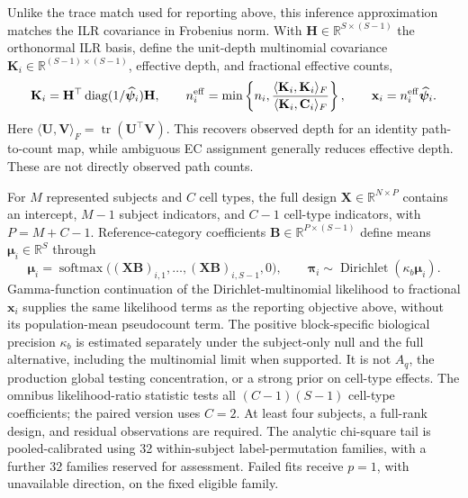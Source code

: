 \documentclass[11pt]{article}
\begin{document}
Unlike the trace match used for reporting above, this inference approximation matches the ILR covariance in Frobenius norm. With \(\mathbf H\in\mathbb R^{S\times(S-1)}\) the orthonormal ILR basis, define the unit-depth multinomial covariance \(\mathbf K_i\in\mathbb R^{(S-1)\times(S-1)}\), effective depth, and fractional effective counts, \begin{equation}\mathbf K_i=\mathbf H^\top\operatorname{diag}(1/\widehat{\boldsymbol\psi}_i)\mathbf H,\qquad n_i^{\rm eff}=\min\left\{n_i,\frac{\langle\mathbf K_i,\mathbf K_i\rangle_F}{\langle\mathbf K_i,\mathbf C_i\rangle_F}\right\},\qquad \mathbf x_i=n_i^{\rm eff}\widehat{\boldsymbol\psi}_i.\end{equation} Here \(\langle\mathbf U,\mathbf V\rangle_F=\operatorname{tr}(\mathbf U^\top\mathbf V)\). This recovers observed depth for an identity path-to-count map, while ambiguous EC assignment generally reduces effective depth. These are not directly observed path counts.

For \(M\) represented subjects and \(C\) cell types, the full design \(\mathbf X\in\mathbb R^{N\times P}\) contains an intercept, \(M-1\) subject indicators, and \(C-1\) cell-type indicators, with \(P=M+C-1\). Reference-category coefficients \(\mathbf B\in\mathbb R^{P\times(S-1)}\) define means \(\boldsymbol\mu_i\in\mathbb R^S\) through \begin{equation}\boldsymbol\mu_i=\operatorname{softmax}\bigl((\mathbf X\mathbf B)_{i,1},\ldots,(\mathbf X\mathbf B)_{i,S-1},0\bigr),\qquad \boldsymbol\pi_i\sim\operatorname{Dirichlet}(\kappa_b\boldsymbol\mu_i).\end{equation} Gamma-function continuation of the Dirichlet-multinomial likelihood to fractional \(\mathbf x_i\) supplies the same likelihood terms as the reporting objective above, without its population-mean pseudocount term. The positive block-specific biological precision \(\kappa_b\) is estimated separately under the subject-only null and the full alternative, including the multinomial limit when supported. It is not \(A_q\), the production global testing concentration, or a strong prior on cell-type effects. The omnibus likelihood-ratio statistic tests all \((C-1)(S-1)\) cell-type coefficients; the paired version uses \(C=2\). At least four subjects, a full-rank design, and residual observations are required. The analytic chi-square tail is pooled-calibrated using 32 within-subject label-permutation families, with a further 32 families reserved for assessment. Failed fits receive \(p=1\), with unavailable direction, on the fixed eligible family.
\end{document}
